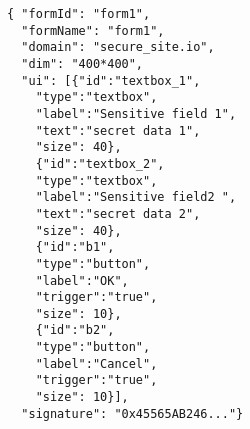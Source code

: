 \begin{figure}[t]
\begin{lstlisting}[mathescape=true]
{ "formId": "form1",
  "formName": "form1",
  "domain": "secure_site.io",
  "dim": "400*400",
  "ui": [{"id":"textbox_1",
  	"type":"textbox",
	"label":"Sensitive field 1",
	"text":"secret data 1",
	"size": 40},
	{"id":"textbox_2",
	"type":"textbox",
	"label":"Sensitive field2 ",
	"text":"secret data 2",
	"size": 40},
	{"id":"b1",
	"type":"button",
	"label":"OK",
	"trigger":"true",
	"size": 10},	
	{"id":"b2",
	"type":"button",
	"label":"Cancel",
	"trigger":"true",
	"size": 10}],
  "signature": "0x45565AB246..."}
\end{lstlisting}
\end{figure}

% 


